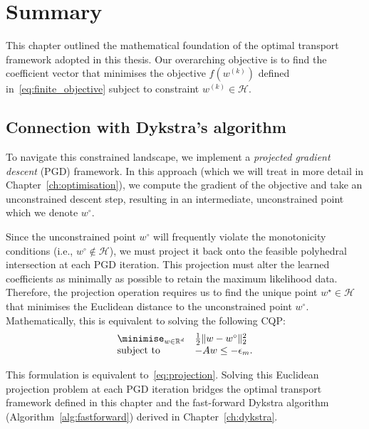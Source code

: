 \section{Summary} \label{sec:optimal_transport_summary}

This chapter outlined the mathematical foundation of the optimal transport framework adopted in this thesis. Our overarching objective is to find the coefficient vector that minimises the objective $f(w^{(k)})$ defined in~\eqref{eq:finite_objective} subject to constraint $w^{(k)} \in \mathcal{H}$.

\subsection{Connection with Dykstra's algorithm}

To navigate this constrained landscape, we implement a \emph{projected gradient descent} (PGD) framework. In this approach (which we will treat in more detail in Chapter~\ref{ch:optimisation}), we compute the gradient of the objective and take an unconstrained descent step, resulting in an intermediate, unconstrained point which we denote $w^\circ$. 

Since the unconstrained point $w^\circ$ will frequently violate the monotonicity conditions (i.e., $w^\circ \notin \mathcal{H}$), we must project it back onto the feasible polyhedral intersection at each PGD iteration. This projection must alter the learned coefficients as minimally as possible to retain the maximum likelihood data. Therefore, the projection operation requires us to find the unique point $w^\star \in \mathcal{H}$ that minimises the Euclidean distance to the unconstrained point $w^\circ$. Mathematically, this is equivalent to solving the following CQP:
\begin{equation}
\begin{array}{ll}
    \displaystyle \minimise_{w \in \mathbb{R}^{d}} & \frac{1}{2}\|w - w^\circ\|_{2}^2 \\
    \text{subject to} & -Aw \le -\epsilon_m.
\end{array}
\label{eq:cqp_projection}
\end{equation}

This formulation is equivalent to~\ref{eq:projection}. Solving this Euclidean projection problem at each PGD iteration bridges the optimal transport framework defined in this chapter and the fast-forward Dykstra algorithm (Algorithm~\ref{alg:fastforward}) derived in Chapter~\ref{ch:dykstra}.